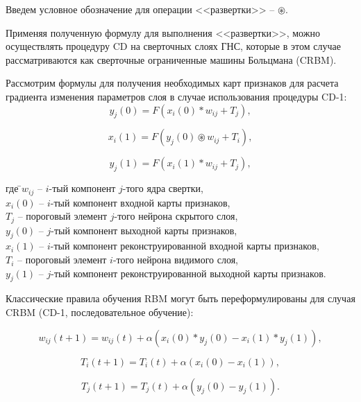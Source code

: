Введем условное обозначение для операции <<развертки>> -- $\circledast$.

Применяя полученную формулу для выполнения <<развертки>>, можно осуществлять процедуру CD на сверточных слоях ГНС, которые в этом случае рассматриваются как сверточные ограниченные машины Больцмана (CRBM). 

Рассмотрим формулы для получения необходимых карт признаков для расчета градиента изменения параметров слоя в случае использования процедуры CD-1: 
\begin{equation*}
    y_j(0) = F(x_i(0) * w_{ij} + T_j),
\end{equation*}

\begin{equation*}
    x_i(1) = F(y_j(0) \circledast w_{ij} + T_i),
\end{equation*}

\begin{equation*}
    y_j(1) = F(x_i(1) * w_{ij} + T_j),
\end{equation*}
\begin{tabbing}	
где \=$w_{ij}$ -- $i$-тый компонент $j$-того ядра свертки,\\
\>$x_i(0)$ -- $i$-тый компонент входной карты признаков,\\
\>$T_j$ -- пороговый элемент $j$-того нейрона скрытого слоя,\\
\>$y_j(0)$ -- $j$-тый компонент выходной карты признаков,\\
\>$x_i(1)$ -- $i$-тый компонент реконструированной входной карты признаков,\\
\>$T_i$ -- пороговый элемент $i$-того нейрона видимого слоя,\\
\>$y_j(1)$ -- $j$-тый компонент реконструированной выходной карты признаков.
\end{tabbing}

Классические правила обучения RBM могут быть переформулированы для случая CRBM (CD-1, последовательное обучение): 

\begin{equation*}
		w_{ij}(t+1)=w_{ij}(t)+\alpha(x_i(0) * y_j(0)-x_i(1) * y_j(1)),
\end{equation*} 

\begin{equation*}	
		T_i(t+1)=T_i(t)+\alpha(x_i(0)-x_i(1)),
\end{equation*} 

\begin{equation*}		
		T_j(t+1)=T_j(t)+\alpha(y_j(0)-y_j(1)).
\end{equation*}

